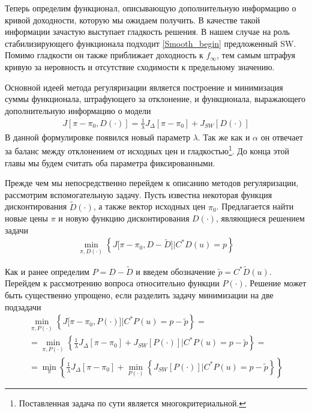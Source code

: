 \documentclass[10pt]{article}
\theoremstyle{definition}
\theoremstyle{remark}
\theoremstyle{plain}
\newcommand{\wt}{\widetilde}
\newcommand{\w}{f_\infty}
\begin{document}
Теперь определим функционал, описывающую дополнительную информацию о кривой доходности, которую мы ожидаем получить. В качестве такой информации зачастую выступает  гладкость решения. В нашем случае на роль стабилизирующего функционала подходит \eqref{Smooth_begin} предложенный SW. Помимо гладкости он также приближает доходность к $\w$, тем самым штрафуя кривую за неровность и отсутствие сходимости к предельному значению. 
 
 Основной идеей метода регуляризации является построение и минимизация суммы функционала, штрафующего за отклонение, и функционала, выражающего дополнительную информацию о модели
\begin{align*}
J\left[\pi - \pi_0, D(\cdot)\right] = \frac{1}{\lambda}J_\Delta[\pi-\pi_0] + J_{SW}[D(\cdot)]
\end{align*}
В данной формулировке появился новый параметр $\lambda$. Так же как и $\alpha$ он отвечает за баланс между отклонением от исходных цен и гладкостью\footnote{Поставленная задача по сути является многокритериальной.}.  До конца этой главы мы будем считать оба параметра фиксированными.

Прежде чем мы непосредственно перейдем к описанию методов регуляризации, рассмотрим вспомогательную задачу.
Пусть известна некоторая функция дисконтирования $\wt{D}(\cdot)$, а также вектор исходных цен $\pi_0$. Предлагается найти новые цены $\pi$ и новую функцию дисконтирования $D(\cdot)$, являющиеся решением задачи
\begin{align}
\min\limits_{\pi,D(\cdot)}
\left\{
	J\bigl[\pi-\pi_0,D - \wt{D}\bigr]
	\Big|
	C^*D(u) = p 
\right\}
\end{align}


Как и ранее определим $P = D - \wt{D}$ и введем обозначение $\tilde{p} = C^*\wt{D}(u)$. Перейдем к рассмотрению вопроса относительно функции $P(\cdot)$. Решение может быть существенно упрощено, если разделить задачу минимизации на две подзадачи
\begin{multline*}
\min\limits_{\pi,P(\cdot)}
\left\{
	J\bigl[\pi-\pi_0,P(\cdot)\bigr]
	\Big|
	C^*P(u) = p - \tilde{p}
\right\} =
\\
= \min\limits_{\pi,P(\cdot)}
\left\{
	\frac{1}{\lambda} J_{\Delta} [\pi - \pi_0] + J_{SW}\left[P(\cdot)\right]
	\Big|
	C^*P(u) = p - \tilde{p} 
\right\}= 
\\
= \min\limits_{\pi} 
\left\{
	\frac{1}{\lambda} J_{\Delta} [\pi - \pi_0] + 
	\min\limits_{P(\cdot)} 
	\left\{
		J_{SW}\left[P(\cdot)\right]
		\Big|
		C^*P(u) = p - \tilde{p} 
	\right\}
\right\}
\end{multline*}
\end{document}
